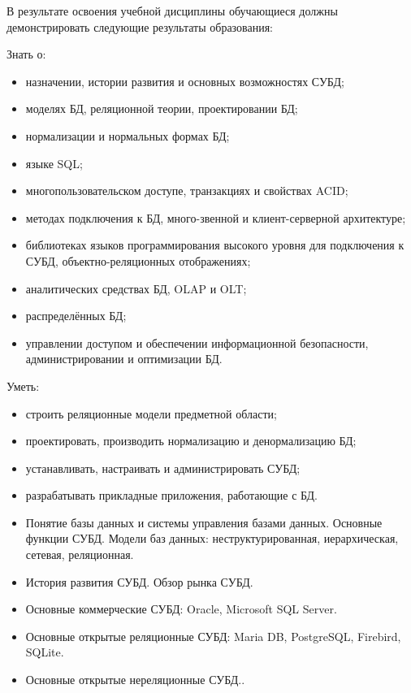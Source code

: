 \documentclass[a4paper]{article}
\begin{document}
\begin{itemize}
\end{itemize}

В результате освоения учебной дисциплины обучающиеся должны демонстрировать следующие результаты образования:

Знать о:
\begin{itemize}
  \item назначении, истории развития и основных возможностях СУБД;
  \item моделях БД, реляционной теории, проектировании БД;
  \item нормализации и нормальных формах БД;
  \item языке SQL;
  \item многопользовательском доступе, транзакциях и свойствах ACID;
  \item методах подключения к БД, много-звенной и клиент-серверной архитектуре;
  \item библиотеках языков программирования высокого уровня для подключения к СУБД, объектно-реляционных отображениях;
  \item аналитических средствах БД, OLAP и OLT;
  \item распределённых БД;
  \item управлении доступом и обеспечении информационной безопасности, администрировании и оптимизации БД.
\end{itemize}

Уметь:
\begin{itemize}
  \item строить реляционные модели предметной области;
  \item проектировать, производить нормализацию и денормализацию БД;
  \item устанавливать, настраивать и администрировать СУБД;
  \item разрабатывать прикладные приложения, работающие с БД.
\end{itemize}

\CourseTheorySection


\begin{itemize}
  \item Понятие базы данных и системы управления базами данных. Основные функции СУБД.
    Модели баз данных: неструктурированная, иерархическая, сетевая, реляционная.
  \item История развития СУБД. Обзор рынка СУБД.
  \item Основные коммерческие СУБД: Oracle, Microsoft SQL Server.
  \item Основные открытые реляционные СУБД: Maria DB, PostgreSQL, Firebird, SQLite.
  \item Основные открытые нереляционные СУБД..
\end{itemize}
\end{document}
